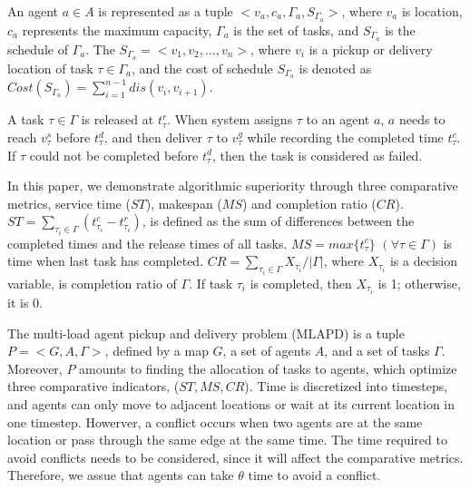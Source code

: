 \documentclass[sigconf,anonymous]{aamas}
\begin{document}

\begin{definition}[Agent]
\label{AgentDfn}
    An agent $a \in A$ is represented as a tuple $<v_{a}, c_{a}, \Gamma_{a}, S_{\Gamma_{a}}>$, 
    where $v_{a}$ is location, $c_{a}$ represents the maximum capacity, 
    $\Gamma_{a}$ is the set of tasks, and $S_{\Gamma_{a}}$ is the schedule of $\Gamma_{a}$. 
    The $S_{\Gamma_{a}} = <v_{1}, v_{2},..., v_{n}>$, 
    where $v_{i}$ is a pickup or delivery location of task $\tau \in \Gamma_{a}$,
    and the cost of schedule $S_{\Gamma_{a}}$ is denoted as 
    $Cost(S_{\Gamma_{a}}) = \sum^{n-1}_{i=1}{dis(v_i, v_{i+1})}$.
\end{definition}

A task $\tau \in \Gamma$ is released at $t^{r}_{\tau}$. 
When system assigns $\tau$ to an agent $a$, 
$a$ needs to reach $v^{s}_{\tau}$ before $t^{d}_{\tau}$, 
and then deliver $\tau$ to $v^g_{\tau}$ while recording the completed time $t^{c}_{\tau}$. 
If $\tau$ could not be completed before $t^{d}_{\tau}$, 
then the task is considered as failed.

\begin{definition}
    In this paper, we demonstrate algorithmic superiority through three comparative metrics, 
    service time (${ST}$), makespan ($MS$) and completion ratio ($CR$). 
    $ST = \sum_{\tau_i \in \Gamma}{(t^{c}_{\tau_i} - t^{r}_{\tau_i})}$, 
    is defined as the sum of differences between the completed times and the release times of all tasks.
    $MS = max{\{t^{c}_{\tau}\}}$ $(\forall \tau \in \Gamma)$ 
    is time when last task has completed.
    $CR = {\sum_{\tau_i \in \Gamma}{X_{\tau_i}}}/{|\Gamma|}$, 
    where $X_{\tau_i}$ is a decision variable, is completion ratio of $\Gamma$. 
    If task $\tau_{i}$ is completed, then $X_{\tau_i}$ is 1; otherwise, it is 0.
       
\end{definition}

\begin{definition}[MLAPD]
\label{ProDfn}
    The multi-load agent pickup and delivery problem (MLAPD) is a tuple $P = <G, A, \Gamma>$, 
    defined by a map $G$, a set of agents $A$, and a set of tasks $\Gamma$. 
    Moreover, $P$ amounts to finding the allocation of tasks to agents, 
    which optimize three comparative indicators, ($ST, MS, CR$).
    Time is discretized into timesteps, and agents can only move to adjacent locations 
    or wait at its current location in one timestep.
    Howerver, a conflict occurs when two agents are at the same location or pass through the same edge at the same time.
    The time required to avoid conflicts needs to be considered, since it will affect the comparative metrics.
    Therefore, we assue that agents can take $\theta$ time to avoid a conflict.
\end{definition}
 
\end{document}
